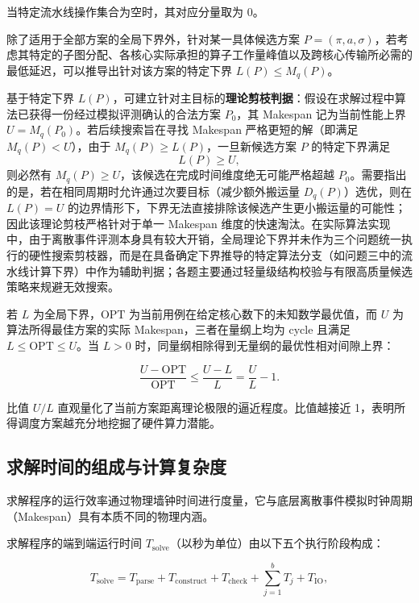 \documentclass[anonymous,notoc]{gmcm2026}
\begin{document}
当特定流水线操作集合为空时，其对应分量取为 0。

除了适用于全部方案的全局下界外，针对某一具体候选方案 \(P = (\pi, a, \sigma)\)，若考虑其特定的子图分配、各核心实际承担的算子工作量峰值以及跨核心传输所必需的最低延迟，可以推导出针对该方案的特定下界 \(L(P) \le M_q(P)\)。

基于特定下界 \(L(P)\)，可建立针对主目标的\textbf{理论剪枝判据}：假设在求解过程中算法已获得一份经过模拟评测确认的合法方案 \(P_0\)，其 Makespan 记为当前性能上界 \(U = M_q(P_0)\)。若后续搜索旨在寻找 Makespan 严格更短的解（即满足 \(M_q(P) < U\)），由于 \(M_q(P) \ge L(P)\)，一旦新候选方案 \(P\) 的特定下界满足 \begin{equation}
L(P) \ge U,
\end{equation} 则必然有 \(M_q(P) \ge U\)，该候选在完成时间维度绝无可能严格超越 \(P_0\)。需要指出的是，若在相同周期时允许通过次要目标（减少额外搬运量 \(D_q(P)\)）选优，则在 \(L(P) = U\) 的边界情形下，下界无法直接排除该候选产生更小搬运量的可能性；因此该理论剪枝严格针对于单一 Makespan 维度的快速淘汰。在实际算法实现中，由于离散事件评测本身具有较大开销，全局理论下界并未作为三个问题统一执行的硬性搜索剪枝器，而是在具备确定下界推导的特定算法分支（如问题三中的流水线计算下界）中作为辅助判据；各题主要通过轻量级结构校验与有限高质量候选策略来规避无效搜索。

若 \(L\) 为全局下界，\(\mathrm{OPT}\) 为当前用例在给定核心数下的未知数学最优值，而 \(U\) 为算法所得最佳方案的实际 Makespan，三者在量纲上均为 cycle 且满足 \(L \le \mathrm{OPT} \le U\)。当 \(L > 0\) 时，同量纲相除得到无量纲的最优性相对间隙上界：

\begin{equation}
\frac{U - \mathrm{OPT}}{\mathrm{OPT}} \le \frac{U - L}{L} = \frac{U}{L} - 1.
\end{equation}

比值 \(U/L\) 直观量化了当前方案距离理论极限的逼近程度。比值越接近 1，表明所得调度方案越充分地挖掘了硬件算力潜能。

\subsection{求解时间的组成与计算复杂度}

求解程序的运行效率通过物理墙钟时间进行度量，它与底层离散事件模拟时钟周期（Makespan）具有本质不同的物理内涵。

求解程序的端到端运行时间 \(T_{\mathrm{solve}}\)（以秒为单位）由以下五个执行阶段构成：

\begin{equation}
T_{\mathrm{solve}} = T_{\mathrm{parse}} + T_{\mathrm{construct}} + T_{\mathrm{check}} + \sum_{j=1}^{b} T_j + T_{\mathrm{IO}},
\end{equation}
\end{document}
